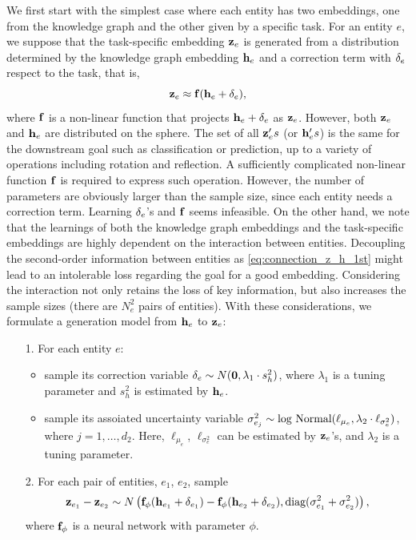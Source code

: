 We first start with the simplest case where each entity has two embeddings, one from the knowledge graph and the other given by a specific task. For an entity $e$, we suppose that the task-specific embedding ${\mathbf z}_{e}$ is generated from a distribution determined by the knowledge graph embedding  ${\mathbf h}_{e}$ and a correction term with ${\mathbf \delta}_e$ respect to the task, that is,
\begin{equation}
  {\mathbf z}_{e} \approx {\mathbf f}({\mathbf h}_e + {\mathbf \delta}_e),
  \label{eq:connection_z_h_1st}
\end{equation}
where ${\mathbf f}$ is a non-linear function that projects ${\mathbf h}_e + {\mathbf \delta}_e$ as ${\mathbf z}_e$. However, both ${\mathbf z}_e$ and ${\mathbf h}_e$ are distributed on the sphere. The set of all ${\mathbf z}_{e}'s$ (or ${\mathbf h}_{e}'s$) is the same for the downstream goal such as classification or prediction, up to a variety of operations including rotation and reflection. A sufficiently complicated non-linear function ${\mathbf f}$ is required to express such operation. However, the number of parameters are obviously larger than the sample size, since each entity needs a correction term. Learning ${\mathbf \delta}_e$'s and ${\mathbf f}$ seems infeasible. On the other hand, we note that the learnings of both the knowledge graph embeddings and the task-specific embeddings are highly dependent on the interaction between entities. Decoupling the second-order information between entities as \eqref{eq:connection_z_h_1st} might lead to an intolerable loss regarding the goal for a good embedding. Considering the interaction not only retains the loss of key information, but also increases the sample sizes (there are $N_e^2$ pairs of entities). With these considerations, we formulate a generation model from ${\mathbf h}_e$ to ${\mathbf z}_e$:
\begin{itemize}
\item [1.] For each entity $e$:
  \begin{itemize}
	\item sample its correction variable ${\mathbf \delta}_e \sim N(\bold 0, \lambda_1 \cdot s_h^2)$, where $\lambda_1$ is a tuning parameter and $s_h^2$ is estimated by $\bold h_e$.
	\item sample its assoiated uncertainty variable ${\mathbf \sigma}_{e_j}^2 \sim \text{log~Normal}(\ell_{\mu_e}, \lambda_2\cdot \ell_{\sigma^2_e})$, where $j = 1, \ldots, d_2$. Here, $\ell_{\mu_e}$, $\ell_{\sigma^2_e}$ can be estimated by $\bold z_e$'s, and $\lambda_2$ is a tuning parameter.
      \end{itemize}
    \item [2.] For each pair of entities, $e_1$, $e_2$, sample
      \begin{equation}
        \bold z_{e_1} - \bold z_{e_2} \sim  N\left ( {\mathbf f}_{\phi}({\mathbf h}_{e_1} +  {\mathbf \delta}_{e_1}) - {\mathbf f}_{\phi}({\mathbf h}_{e_2} + {\mathbf \delta}_{e_2}), \text{diag}({\mathbf \sigma}_{e_1}^2 + {\mathbf \sigma}_{e_2}^2) \right),
        \label{eq:connection_z_h_2nd}
        \end{equation}
where ${\mathbf f}_{\phi}$ is a neural network with parameter $\phi$. 
\end{itemize}
